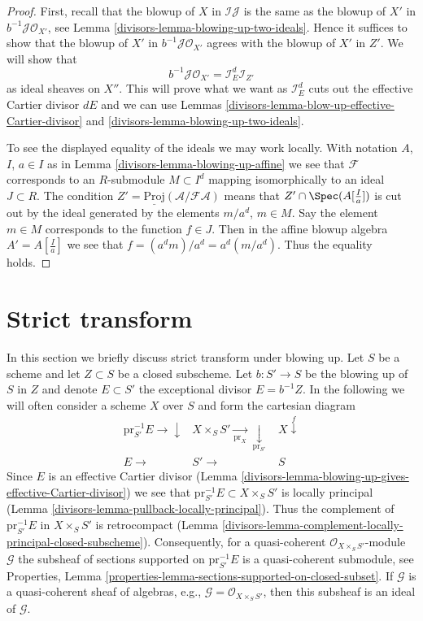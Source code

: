 \begin{proof}
\medskip\noindent
First, recall that the blowup of $X$ in $\mathcal{I}\mathcal{J}$
is the same as the blowup of $X'$ in $b^{-1}\mathcal{J} \mathcal{O}_{X'}$,
see Lemma \ref{divisors-lemma-blowing-up-two-ideals}.
Hence it suffices to show that the blowup of $X'$ in
$b^{-1}\mathcal{J} \mathcal{O}_{X'}$ agrees with the blowup of $X'$
in $Z'$. We will show that
$$
b^{-1}\mathcal{J} \mathcal{O}_{X'} = \mathcal{I}_E^d \mathcal{I}_{Z'}
$$
as ideal sheaves on $X''$. This will prove what we want as
$\mathcal{I}_E^d$ cuts out the effective Cartier divisor $dE$
and we can use Lemmas \ref{divisors-lemma-blow-up-effective-Cartier-divisor} and
\ref{divisors-lemma-blowing-up-two-ideals}.

\medskip\noindent
To see the displayed equality of the ideals we may work locally.
With notation $A$, $I$, $a \in I$ as in Lemma \ref{divisors-lemma-blowing-up-affine}
we see that $\mathcal{F}$ corresponds to an $R$-submodule $M \subset I^d$
mapping isomorphically to an ideal $J \subset R$. The condition
$Z' = \underline{\text{Proj}}(\mathcal{A}/\mathcal{F}\mathcal{A})$
means that $Z' \cap \Spec(A[\frac{I}{a}])$ is cut out by the ideal
generated by the elements $m/a^d$, $m \in M$. Say the element $m \in M$
corresponds to the function $f \in J$. Then in the affine blowup algebra
$A' = A[\frac{I}{a}]$ we see that $f = (a^dm)/a^d = a^d (m/a^d)$.
Thus the equality holds.
\end{proof}

\section{Strict transform}
\label{divisors-section-strict-transform}
In this section we briefly discuss strict transform under blowing up.
Let $S$ be a scheme and let $Z \subset S$ be a closed subscheme.
Let $b : S' \to S$ be the blowing up of $S$ in $Z$ and denote $E \subset S'$
the exceptional divisor $E = b^{-1}Z$. In the following we will often
consider a scheme $X$ over $S$ and form the cartesian diagram
$$
\begin{array}{ccc}\text{pr}_{S'}^{-1}E \longrightarrow\downarrow & X \times_S S' \underset{\text{pr}_X}{\longrightarrow}\underset{\text{pr}_{S'}}{\downarrow} & X \overset{f}{\downarrow} \\ E \longrightarrow & S' \longrightarrow & S\end{array}
$$
Since $E$ is an effective Cartier divisor
(Lemma \ref{divisors-lemma-blowing-up-gives-effective-Cartier-divisor})
we see that $\text{pr}_{S'}^{-1}E \subset X \times_S S'$
is locally principal
(Lemma \ref{divisors-lemma-pullback-locally-principal}).
Thus the complement of $\text{pr}_{S'}^{-1}E$ in $X \times_S S'$
is retrocompact
(Lemma \ref{divisors-lemma-complement-locally-principal-closed-subscheme}).
Consequently, for a quasi-coherent $\mathcal{O}_{X \times_S S'}$-module
$\mathcal{G}$ the subsheaf of sections supported on $\text{pr}_{S'}^{-1}E$
is a quasi-coherent submodule, see
Properties, Lemma \ref{properties-lemma-sections-supported-on-closed-subset}.
If $\mathcal{G}$ is a quasi-coherent sheaf of algebras, e.g.,
$\mathcal{G} = \mathcal{O}_{X \times_S S'}$, then this subsheaf is an ideal
of $\mathcal{G}$.

